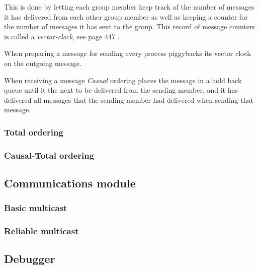 \documentclass[titlepage, twocolumn, a4paper, 10pt]{article}
\begin{document}
This is done by letting each group member keep track of the number of
messages it has delivered from each other group member as well as
keeping a counter for the number of messages it has sent to the group.
This record of message counters is called a \textit{vector-clock}, see
page 447 \cite{book:dist-syst}.

When preparing a message for sending every process piggybacks its
vector clock on the outgoing message.

When receiving a message \textit{Casual} ordering places the message
in a hold back queue until it the next to be delivered from the
sending member, and it has delivered all messages that the sending
member had delivered when sending that message.

\subsubsection{Total ordering}\label{sec:total}
\subsubsection{Causal-Total ordering}\label{sec:causal-total}

\subsection{Communications module}\label{sec:communications-module}
\subsubsection{Basic multicast}\label{sec:basic-multicast}
\subsubsection{Reliable multicast}\label{sec:reliable-multicast}

\subsection{Debugger}\label{sec:debugger}


\end{document}
